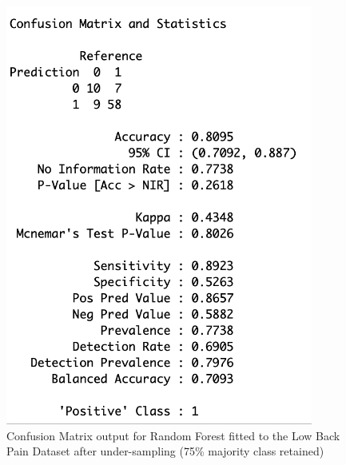 \begin{figure}[!htbp]
    \centering
    \begin{minipage}{0.45\textwidth}
        \centering
        \includegraphics[width=0.9\textwidth]{ThesisTemplate/appendix/images/Chapter5Appendix/ConfusionMatrix75/LBP.png}
        \caption{Confusion Matrix output for Random Forest fitted to the Low Back Pain Dataset after under-sampling (75\% majority class retained)}
        \label{fig:my_label}
    \end{minipage}\hfill
    \begin{minipage}{0.45\textwidth}
        \centering

\end{minipage}
\end{figure}

